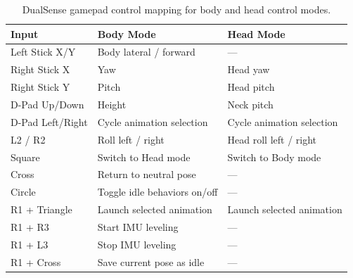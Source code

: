 \begin{table}[H]
\centering
\begin{tabular}{|l|l|l|}
    \hline
    \textbf{Input} & \textbf{Body Mode} & \textbf{Head Mode} \\
    \hline
    Left Stick X/Y & Body lateral / forward & — \\
    \hline
    Right Stick X & Yaw & Head yaw \\
    \hline
    Right Stick Y & Pitch & Head pitch \\
    \hline
    D-Pad Up/Down & Height & Neck pitch \\
    \hline
    D-Pad Left/Right & Cycle animation selection & Cycle animation selection \\
    \hline
    L2 / R2 & Roll left / right & Head roll left / right \\
    \hline
    Square & Switch to Head mode & Switch to Body mode \\
    \hline
    Cross & Return to neutral pose & — \\
    \hline
    Circle & Toggle idle behaviors on/off & — \\
    \hline
    R1 + Triangle & Launch selected animation & Launch selected animation \\
    \hline
    R1 + R3 & Start IMU leveling & — \\
    \hline
    R1 + L3 & Stop IMU leveling & — \\
    \hline
    R1 + Cross & Save current pose as idle & — \\
    \hline
\end{tabular}
\caption{DualSense gamepad control mapping for body and head 
control modes. }
\label{tab:joystick}
\end{table}